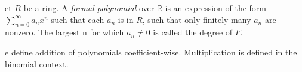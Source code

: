 \documentclass[12pt]{article}
\newcommand{\R}{\mathbb{R}}
\newenvironment{definition}[2][Definition]{\begin{trivlist}
    \item[\hskip \labelsep {\bfseries #1}\hskip \labelsep {\bfseries #2.}]}{\end{trivlist}}
\begin{document}
\begin{definition}
    Let $R$ be a ring. A \textit{formal polynomial} over $\R$ is an expression of the form $\sum_{n = 0}^\infty a_nx^n$ such that each $a_n$ is in $R$, such that only finitely many $a_n$ are nonzero. The largest n for which $a_n \neq 0$ is called the degree of $F$. 
\end{definition}

\begin{definition}
    We define addition of polynomials coefficient-wise. Multiplication is defined in the binomial context.
\end{definition}
\end{document}
